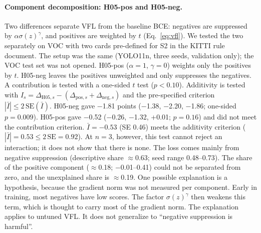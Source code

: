 \documentclass[pdflatex,iicol,sn-mathphys-num]{sn-jnl}
\begin{document}
\paragraph{Component decomposition: H05-pos and H05-neg.}\label{sec:h05-mekanizma}
Two differences separate VFL from the baseline BCE: negatives are suppressed by $\alpha\sigma(z)^\gamma$, and positives are weighted by $t$ (Eq.~\eqref{eq:vfl}). We tested the two separately on VOC with two cards pre-defined for S2 in the KITTI rule document. The setup was the same (YOLO11n, three seeds, validation only); the VOC test set was not opened. H05-pos ($\alpha=1$, $\gamma=0$) weights only the positives by $t$. H05-neg leaves the positives unweighted and only suppresses the negatives. A contribution is tested with a one-sided $t$ test ($p<0.10$). Additivity is tested with $I_s=\Delta_{\mathrm{H05},s}-(\Delta_{\mathrm{pos},s}+\Delta_{\mathrm{neg},s})$ and the pre-specified criterion $|\bar I|\le2\,\mathrm{SE}(\bar I)$. H05-neg gave $-$1.81 points ($-$1.38, $-$2.20, $-$1.86; one-sided $p=0.009$). H05-pos gave $-$0.52 ($-$0.26, $-$1.32, +0.01; $p=0.16$) and did not meet the contribution criterion. $\bar I=-0.53$ (SE 0.46) meets the additivity criterion ($|\bar I|=0.53\le2\,\mathrm{SE}=0.92$). At $n=3$, however, this test cannot reject an interaction; it does not show that there is none. The loss comes mainly from negative suppression (descriptive share $\approx$0.63; seed range 0.48--0.73). The share of the positive component ($\approx$0.18; $-$0.01--0.41) could not be separated from zero, and the unexplained share is $\approx$0.19. One possible explanation is a hypothesis, because the gradient norm was not measured per component. Early in training, most negatives have low scores. The factor $\sigma(z)^\gamma$ then weakens this term, which is thought to carry most of the gradient norm. The explanation applies to untuned VFL. It does not generalize to ``negative suppression is harmful''.
\end{document}
